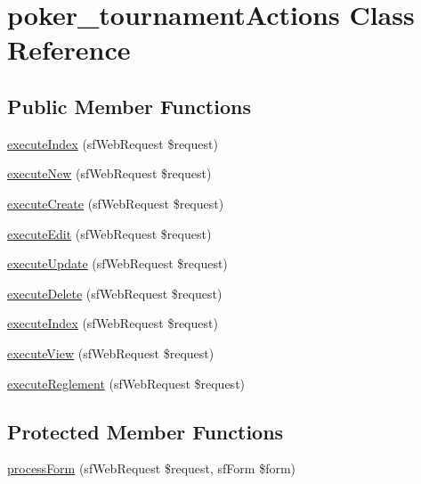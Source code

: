 \hypertarget{classpoker__tournament_actions}{\section{poker\-\_\-tournament\-Actions Class Reference}
\label{classpoker__tournament_actions}
}
\subsection*{Public Member Functions}
\begin{DoxyCompactItemize}
\item 
\hyperlink{classpoker__tournament_actions_a948cc911eb1d9f77990be54af3b2080f}{execute\-Index} (sf\-Web\-Request \$request)
\item 
\hyperlink{classpoker__tournament_actions_a0ffbea56560c6c633dae68ec22aff21c}{execute\-New} (sf\-Web\-Request \$request)
\item 
\hyperlink{classpoker__tournament_actions_a75837617743fb64dca82d8133b2c662a}{execute\-Create} (sf\-Web\-Request \$request)
\item 
\hyperlink{classpoker__tournament_actions_af4d8fedd4b28f3398826a1bb8fa54394}{execute\-Edit} (sf\-Web\-Request \$request)
\item 
\hyperlink{classpoker__tournament_actions_af7b4f51862add3c2ebb54efc136a0840}{execute\-Update} (sf\-Web\-Request \$request)
\item 
\hyperlink{classpoker__tournament_actions_a52b5b11b11a0070dd2662257520c045a}{execute\-Delete} (sf\-Web\-Request \$request)
\item 
\hyperlink{classpoker__tournament_actions_a948cc911eb1d9f77990be54af3b2080f}{execute\-Index} (sf\-Web\-Request \$request)
\item 
\hyperlink{classpoker__tournament_actions_ad61d212fa3f7e8cb4190700a8a670606}{execute\-View} (sf\-Web\-Request \$request)
\item 
\hyperlink{classpoker__tournament_actions_a1124fcc78c06d1378ea8979d5c484cad}{execute\-Reglement} (sf\-Web\-Request \$request)
\end{DoxyCompactItemize}
\subsection*{Protected Member Functions}
\begin{DoxyCompactItemize}
\item 
\hyperlink{classpoker__tournament_actions_a7cf661d837626e0320753cbffa019a01}{process\-Form} (sf\-Web\-Request \$request, sf\-Form \$form)
\end{DoxyCompactItemize}


